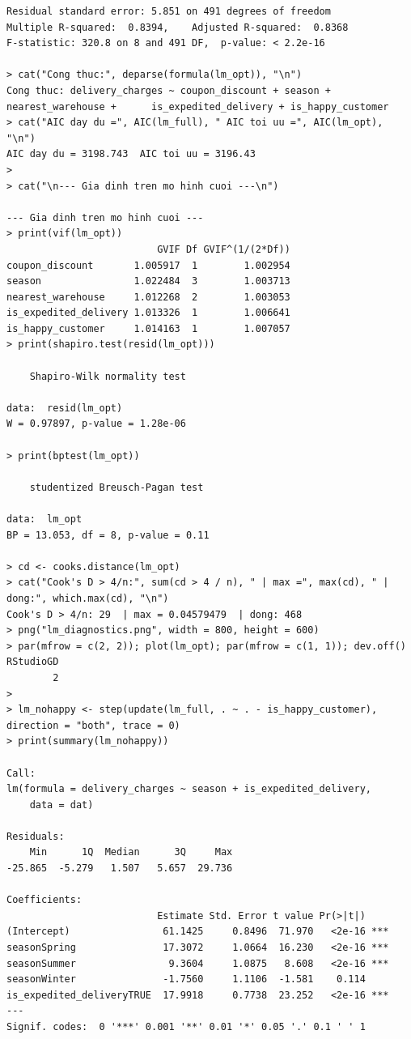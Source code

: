 \documentclass[12pt, a4paper]{article}
\begin{document}
\begin{lstlisting}
Residual standard error: 5.851 on 491 degrees of freedom
Multiple R-squared:  0.8394,	Adjusted R-squared:  0.8368 
F-statistic: 320.8 on 8 and 491 DF,  p-value: < 2.2e-16

> cat("Cong thuc:", deparse(formula(lm_opt)), "\n")
Cong thuc: delivery_charges ~ coupon_discount + season + nearest_warehouse +      is_expedited_delivery + is_happy_customer 
> cat("AIC day du =", AIC(lm_full), " AIC toi uu =", AIC(lm_opt), "\n")
AIC day du = 3198.743  AIC toi uu = 3196.43 
> 
> cat("\n--- Gia dinh tren mo hinh cuoi ---\n")

--- Gia dinh tren mo hinh cuoi ---
> print(vif(lm_opt))                                   
                          GVIF Df GVIF^(1/(2*Df))
coupon_discount       1.005917  1        1.002954
season                1.022484  3        1.003713
nearest_warehouse     1.012268  2        1.003053
is_expedited_delivery 1.013326  1        1.006641
is_happy_customer     1.014163  1        1.007057
> print(shapiro.test(resid(lm_opt)))

	Shapiro-Wilk normality test

data:  resid(lm_opt)
W = 0.97897, p-value = 1.28e-06

> print(bptest(lm_opt))                                

	studentized Breusch-Pagan test

data:  lm_opt
BP = 13.053, df = 8, p-value = 0.11

> cd <- cooks.distance(lm_opt)
> cat("Cook's D > 4/n:", sum(cd > 4 / n), " | max =", max(cd), " | dong:", which.max(cd), "\n")
Cook's D > 4/n: 29  | max = 0.04579479  | dong: 468 
> png("lm_diagnostics.png", width = 800, height = 600)
> par(mfrow = c(2, 2)); plot(lm_opt); par(mfrow = c(1, 1)); dev.off()
RStudioGD 
        2 
> 
> lm_nohappy <- step(update(lm_full, . ~ . - is_happy_customer), direction = "both", trace = 0)
> print(summary(lm_nohappy))

Call:
lm(formula = delivery_charges ~ season + is_expedited_delivery, 
    data = dat)

Residuals:
    Min      1Q  Median      3Q     Max 
-25.865  -5.279   1.507   5.657  29.736 

Coefficients:
                          Estimate Std. Error t value Pr(>|t|)    
(Intercept)                61.1425     0.8496  71.970   <2e-16 ***
seasonSpring               17.3072     1.0664  16.230   <2e-16 ***
seasonSummer                9.3604     1.0875   8.608   <2e-16 ***
seasonWinter               -1.7560     1.1106  -1.581    0.114    
is_expedited_deliveryTRUE  17.9918     0.7738  23.252   <2e-16 ***
---
Signif. codes:  0 '***' 0.001 '**' 0.01 '*' 0.05 '.' 0.1 ' ' 1


\end{lstlisting}
\end{document}
